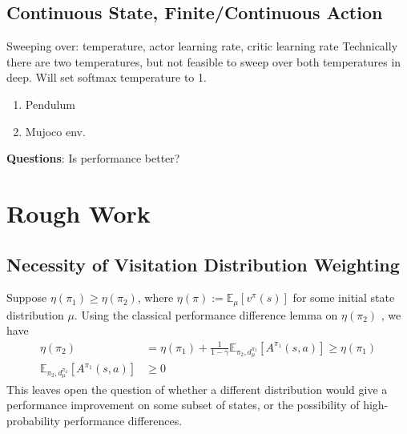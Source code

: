 \documentclass{article}
\newcommand{\Ex}{\mathbb{E}}
\newcommand{\actionspace}{\mathcal{A}}
\newcommand{\KL}{\mathrm{KL}}
\newcommand{\policyparams}{\theta}
\newcommand{\boltzmannQ}{\mathcal{B}Q}
\newcommand{\entropy}{\mathrm{H}}
\begin{document}
\subsection{Continuous State, Finite/Continuous Action}
Sweeping over: temperature, actor learning rate, critic learning rate
Technically there are two temperatures, but not feasible to sweep over both temperatures in deep. 
Will set softmax temperature to 1.
\begin{enumerate}
    \item Pendulum
    \item Mujoco env.
\end{enumerate}

\textbf{Questions}: Is performance better?


\section{Rough Work}
\subsection{Necessity of Visitation Distribution Weighting}
Suppose $\eta(\pi_1) \geq \eta(\pi_2)$, where $\eta(\pi) := \Ex_\mu[v^\pi(s)]$ for some initial state distribution $\mu$. Using the classical performance difference lemma on $\eta(\pi_2)$ \citep{kakade2002approximately}, we have 
\begin{align*}
    \eta(\pi_2) &= \eta(\pi_1) + \frac{1}{1 - \gamma} \Ex_{\pi_2, d^{\pi_2}_\mu}[A^{\pi_1}(s, a)] \geq \eta(\pi_1)\\
    \Ex_{\pi_2, d^{\pi_2}_\mu}[A^{\pi_1}(s, a)] &\geq 0
\end{align*}
This leaves open the question of whether a different distribution would give a performance improvement on some subset of states, or the possibility of high-probability performance differences. 

\end{document}
